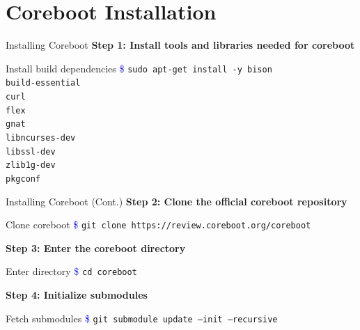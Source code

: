 \documentclass{beamer}
\begin{document}
	\section{Coreboot Installation}
	\begin{frame}{Installing Coreboot}
		\textbf{Step 1: Install tools and libraries needed for coreboot}
		
		\begin{exampleblock}{Install build dependencies}
			\textcolor{blue}{\$} \texttt{sudo apt-get install -y bison \\
				\hspace*{3.4em}build-essential \\
				\hspace*{3.4em}curl \\
				\hspace*{3.4em}flex \\
				\hspace*{3.4em}gnat \\
				\hspace*{3.4em}libncurses-dev \\
				\hspace*{3.4em}libssl-dev \\
				\hspace*{3.4em}zlib1g-dev \\
				\hspace*{3.4em}pkgconf}
		\end{exampleblock}
	\end{frame}
	
	
	
	\begin{frame}{Installing Coreboot (Cont.)}
		\textbf{Step 2: Clone the official coreboot repository}
		
		\begin{exampleblock}{Clone coreboot}
			\textcolor{blue}{\$} \texttt{git clone https://review.coreboot.org/coreboot}
		\end{exampleblock}
		
		\textbf{Step 3: Enter the coreboot directory}
		
		\begin{exampleblock}{Enter directory}
			\textcolor{blue}{\$} \texttt{cd coreboot}
		\end{exampleblock}
		
		\textbf{Step 4: Initialize submodules}
		
		\begin{exampleblock}{Fetch submodules}
			\textcolor{blue}{\$} \texttt{git submodule update --init --recursive}
		\end{exampleblock}
	\end{frame}
	
\end{document}
